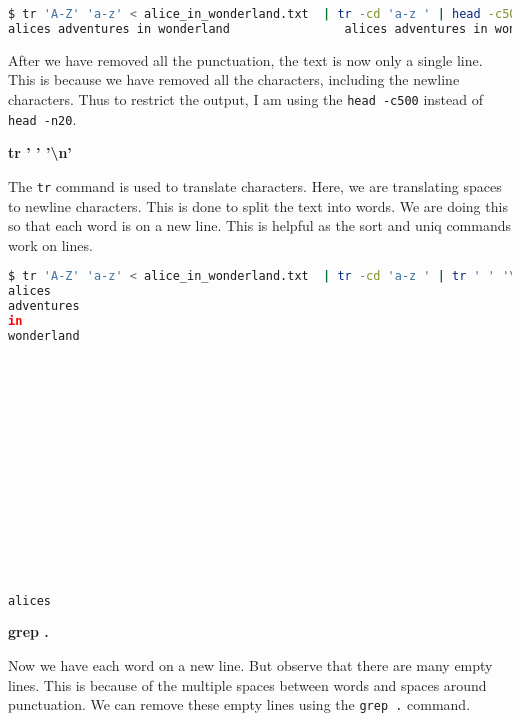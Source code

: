 \begin{lstlisting}[language=bash]
$ tr 'A-Z' 'a-z' < alice_in_wonderland.txt  | tr -cd 'a-z ' | head -c500
alices adventures in wonderland                alices adventures in wonderland                          lewis carroll               the millennium fulcrum edition                             chapter i                      down the rabbithole  alice was beginning to get very tired of sitting by her sisteron the bank and of having nothing to do  once or twice she hadpeeped into the book her sister was reading but it had nopictures or conversations in it and what is the use of a bookthought alice w
\end{lstlisting}

\begin{remark}
  After we have removed all the punctuation, the text is now
  only a single line. This is because we have removed all the
  characters, including the newline characters.
  Thus to restrict the output, I am using the \lstinline|head -c500|
  instead of \lstinline|head -n20|.
\end{remark}

\textbf{tr ' ' '\textbackslash n'}

The \lstinline|tr| command is used to translate characters. Here, we are
translating spaces to newline characters. This is done to split the
text into words. We are doing this so that each word is on a new line.
This is helpful as the sort and uniq commands work on lines.

\begin{lstlisting}[language=bash]
$ tr 'A-Z' 'a-z' < alice_in_wonderland.txt  | tr -cd 'a-z ' | tr ' ' '\n' | head -20
alices
adventures
in
wonderland















alices
\end{lstlisting}

\textbf{grep .}

Now we have each word on a new line.
But observe that there are many empty lines.
This is because of the multiple spaces between words and spaces around
punctuation. We can remove these empty lines using the \lstinline|grep .|
command.

